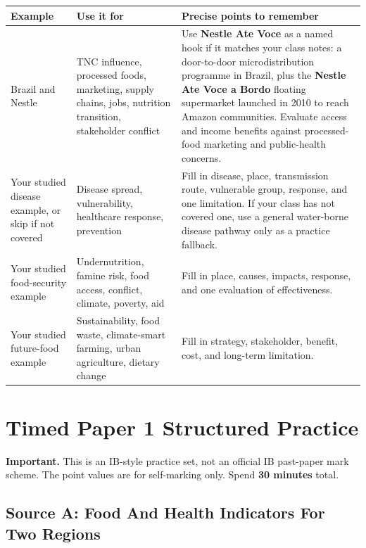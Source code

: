 \documentclass[11pt,a4paper]{article}
\newcommand{\term}[1]{\textcolor{HeadingBlue}{\textbf{#1}}}
\newcommand{\boxnote}[3]{%
\noindent\colorbox{#1}{%
  \begin{minipage}{0.965\textwidth}
  \sffamily
  \textbf{\textcolor{HeadingBlue}{#2}} #3
  \end{minipage}
}}
\begin{document}
\begin{tabularx}{\textwidth}{L{0.2\textwidth}Y Y}
\toprule
\textbf{Example} & \textbf{Use it for} & \textbf{Precise points to remember} \\
\midrule
Brazil and Nestle & TNC influence, processed foods, marketing, supply chains,
jobs, nutrition transition, stakeholder conflict & Use \term{Nestle Ate Voce}
as a named hook if it matches your class notes: a door-to-door microdistribution
programme in Brazil, plus the \term{Nestle Ate Voce a Bordo} floating
supermarket launched in 2010 to reach Amazon communities. Evaluate access and
income benefits against processed-food marketing and public-health concerns. \\
Your studied disease example, or skip if not covered & Disease spread,
vulnerability, healthcare response, prevention & Fill in disease, place,
transmission route, vulnerable group, response, and one limitation. If your
class has not covered one, use a general water-borne disease pathway only as a
practice fallback. \\
Your studied food-security example & Undernutrition, famine risk, food access,
conflict, climate, poverty, aid & Fill in place, causes, impacts, response, and
one evaluation of effectiveness. \\
Your studied future-food example & Sustainability, food waste, climate-smart
farming, urban agriculture, dietary change & Fill in strategy, stakeholder,
benefit, cost, and long-term limitation. \\
\bottomrule
\end{tabularx}

\section{Timed Paper 1 Structured Practice}

\boxnote{SoftRed}{Important.}{This is an IB-style practice set, not an official
IB past-paper mark scheme. The point values are for self-marking only. Spend
\term{30 minutes} total.}

\subsection{Source A: Food And Health Indicators For Two Regions}
\end{document}
